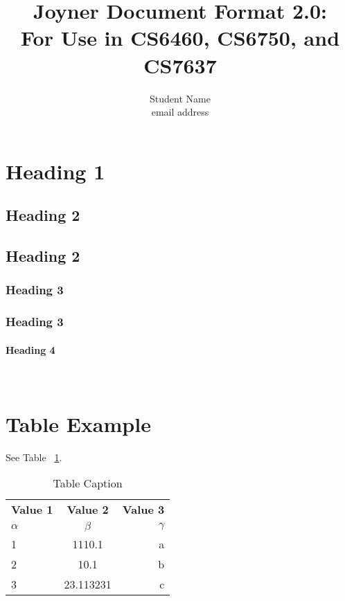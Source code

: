 \documentclass{jdf}
\title{Joyner Document Format 2.0:\\ For Use in CS6460, CS6750, and CS7637}
\author{Student Name \\ email address}
\begin{document}
\maketitle

\thispagestyle{fancy}

\begin{abstract}
\lipsum[1]

\end{abstract}

\section{Heading 1}
\lipsum[2]

\subsection{Heading 2}
\lipsum[3]

\subsection{Heading 2}
\lipsum[3]


\subsubsection{Heading 3}
\lipsum[4]

\subsubsection{Heading 3}
\lipsum[4]

\paragraph*{Heading 4}\textemdash\
\lipsum[5]

\section*{Table Example}
See Table ~\ref{table:1}.
\begin{table}[H]
  \begin{center}
    \caption{Table Caption}
    \label{table:1}
    \begin{tabular}{l|c|r}
      \textbf{Value 1} & \textbf{Value 2} & \textbf{Value 3}\\
      $\alpha$ & $\beta$ & $\gamma$ \\
      \hline
      1 & 1110.1 & a\\
      2 & 10.1 & b\\
      3 & 23.113231 & c\\
    \end{tabular}
  \end{center}
\end{table}
\end{document}
